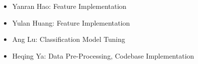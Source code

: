 \begin{itemize}
\item Yanran Hao: Feature Implementation
\item Yulan Huang: Feature Implementation
\item Ang Lu: Classification Model Tuning
\item Heqing Ya: Data Pre-Processing, Codebase Implementation
\end{itemize}